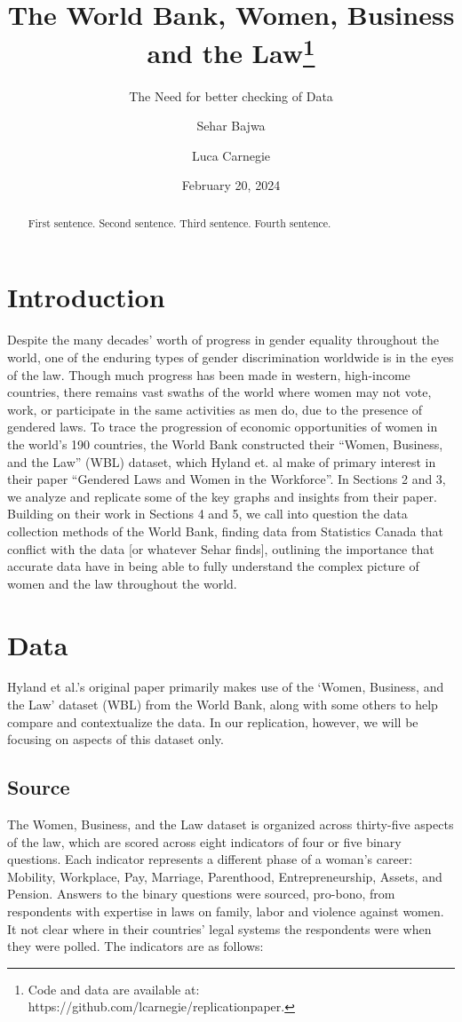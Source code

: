 \documentclass[
  letterpaper,
  DIV=11,
  numbers=noendperiod]{scrartcl}
\title{The World Bank, Women, Business and the Law\thanks{Code and data
are available at: https://github.com/lcarnegie/replicationpaper.}}
\subtitle{The Need for better checking of Data}
\author{Sehar Bajwa \and Luca Carnegie}
\date{February 20, 2024}
\begin{document}
\maketitle
\begin{abstract}
First sentence. Second sentence. Third sentence. Fourth sentence.
\end{abstract}

\section{Introduction}\label{introduction}

Despite the many decades' worth of progress in gender equality
throughout the world, one of the enduring types of gender discrimination
worldwide is in the eyes of the law. Though much progress has been made
in western, high-income countries, there remains vast swaths of the
world where women may not vote, work, or participate in the same
activities as men do, due to the presence of gendered laws. To trace the
progression of economic opportunities of women in the world's 190
countries, the World Bank constructed their ``Women, Business, and the
Law'' (WBL) dataset, which Hyland et. al make of primary interest in
their paper ``Gendered Laws and Women in the Workforce''. In Sections 2
and 3, we analyze and replicate some of the key graphs and insights from
their paper. Building on their work in Sections 4 and 5, we call into
question the data collection methods of the World Bank, finding data
from Statistics Canada that conflict with the data {[}or whatever Sehar
finds{]}, outlining the importance that accurate data have in being able
to fully understand the complex picture of women and the law throughout
the world.

\section{Data}\label{sec-data}

Hyland et al.'s original paper primarily makes use of the `Women,
Business, and the Law' dataset (WBL) from the World Bank, along with
some others to help compare and contextualize the data. In our
replication, however, we will be focusing on aspects of this dataset
only.

\subsection{Source}\label{subsec1-data}

The Women, Business, and the Law dataset is organized across thirty-five
aspects of the law, which are scored across eight indicators of four or
five binary questions. Each indicator represents a different phase of a
woman's career: Mobility, Workplace, Pay, Marriage, Parenthood,
Entrepreneurship, Assets, and Pension. Answers to the binary questions
were sourced, pro-bono, from respondents with expertise in laws on
family, labor and violence against women. It not clear where in their
countries' legal systems the respondents were when they were polled. The
indicators are as follows:
\end{document}
